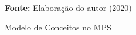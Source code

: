 \begin{figure}[ht!]
\centering

\caption{\textmd{Modelo de Conceitos no \gls{MPS}}}
\label{fig:classesmps}

\par\medskip\textbf{Fonte:} Elaboração do autor (2020) \par\medskip

\end{figure}

